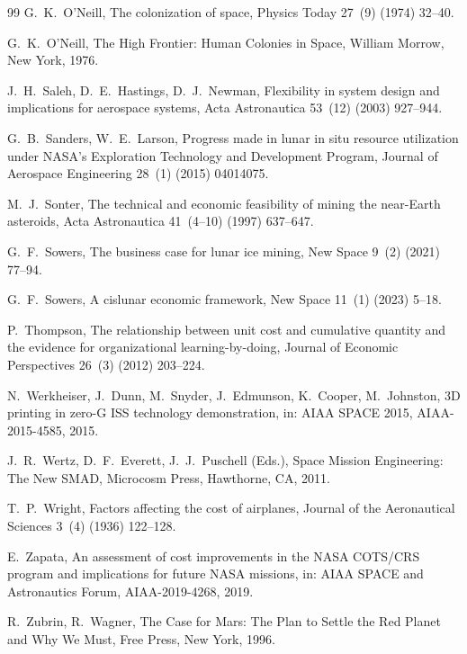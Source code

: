 \documentclass[preprint,12pt]{elsarticle}
\begin{document}
\begin{thebibliography}{99}
G.~K.~O'Neill,
\newblock The colonization of space,
\newblock Physics Today 27~(9) (1974) 32--40.

G.~K.~O'Neill,
\newblock The High Frontier: Human Colonies in Space,
\newblock William Morrow, New York, 1976.

J.~H.~Saleh, D.~E.~Hastings, D.~J.~Newman,
\newblock Flexibility in system design and implications for aerospace systems,
\newblock Acta Astronautica 53~(12) (2003) 927--944.

G.~B.~Sanders, W.~E.~Larson,
\newblock Progress made in lunar in situ resource utilization under NASA's Exploration Technology and Development Program,
\newblock Journal of Aerospace Engineering 28~(1) (2015) 04014075.

M.~J.~Sonter,
\newblock The technical and economic feasibility of mining the near-Earth asteroids,
\newblock Acta Astronautica 41~(4--10) (1997) 637--647.

G.~F.~Sowers,
\newblock The business case for lunar ice mining,
\newblock New Space 9~(2) (2021) 77--94.

G.~F.~Sowers,
\newblock A cislunar economic framework,
\newblock New Space 11~(1) (2023) 5--18.

P.~Thompson,
\newblock The relationship between unit cost and cumulative quantity and the evidence for organizational learning-by-doing,
\newblock Journal of Economic Perspectives 26~(3) (2012) 203--224.

N.~Werkheiser, J.~Dunn, M.~Snyder, J.~Edmunson, K.~Cooper, M.~Johnston,
\newblock 3D printing in zero-G ISS technology demonstration,
\newblock in: AIAA SPACE 2015, AIAA-2015-4585, 2015.

J.~R.~Wertz, D.~F.~Everett, J.~J.~Puschell (Eds.),
\newblock Space Mission Engineering: The New SMAD,
\newblock Microcosm Press, Hawthorne, CA, 2011.

T.~P.~Wright,
\newblock Factors affecting the cost of airplanes,
\newblock Journal of the Aeronautical Sciences 3~(4) (1936) 122--128.

E.~Zapata,
\newblock An assessment of cost improvements in the NASA COTS/CRS program and implications for future NASA missions,
\newblock in: AIAA SPACE and Astronautics Forum, AIAA-2019-4268, 2019.

R.~Zubrin, R.~Wagner,
\newblock The Case for Mars: The Plan to Settle the Red Planet and Why We Must,
\newblock Free Press, New York, 1996.

\end{thebibliography}
\end{document}

